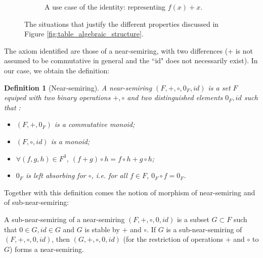 \documentclass[11pt,a4paper]{article}
\newtheorem{definition}{Definition}
\theoremstyle{definition}
\begin{document}
\begin{figure}
	\begin{subfigure}{\textwidth}
		\centering
		\caption{A use case of the identity: representing $f(x) + x$.}
		\label{subfig:drawings_id}
	\end{subfigure}
\caption{The situations that justify the different properties discussed in Figure \ref{fig:table_algebraic_structure}.}
\label{fig:drawings_algebraic_struct}
\end{figure}

The axiom identified are those of a near-semiring, with two differences (+ is not assumed to be commutative in general and the ``id" does not necessarily exist). In our case, we obtain the definition:

\begin{definition}[Near-semiring]

	A \textit{near-semiring} $(F,+,\circ,0_F,id)$ is a set $F$ equiped with two binary operations $+,\circ$ and two distinguished elements $0_F,id$ such that :
	
	\begin{itemize}

		\item $(F,+,0_F)$ is a commutative monoid;

		\item $(F,\circ,id)$ is a monoid;

		\item $\forall (f,g,h) \in F^3$, $(f+g) \circ h = f \circ h + g \circ h$;

		\item $0_F$ is left absorbing for $\circ$, i.e. for all $f \in F$, $0_F \circ f = 0_F$.

	\end{itemize}

\end{definition}

Together with this definition comes the notion of morphism of near-semiring and of sub-near-semiring:

A sub-near-semiring of a near-semiring $(F,+,\circ,0,id)$ is a subset $G \subset F$ such that $0 \in G, id \in G$ and $G$ is stable by $+$ and $\circ$. If $G$ is a sub-near-semiring of $(F,+,\circ,0,id)$, then $(G,+,\circ,0,id)$ (for the restriction of operations + and $\circ$ to $G$) forms a near-semiring.
\end{document}
